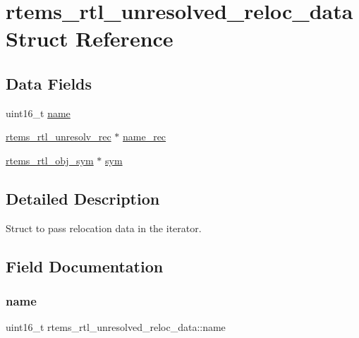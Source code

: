 \hypertarget{structrtems__rtl__unresolved__reloc__data}{}\section{rtems\+\_\+rtl\+\_\+unresolved\+\_\+reloc\+\_\+data Struct Reference}
\label{structrtems__rtl__unresolved__reloc__data}
\subsection*{Data Fields}
\begin{DoxyCompactItemize}
\item 
uint16\+\_\+t \mbox{\hyperlink{structrtems__rtl__unresolved__reloc__data_aeb4f36b3e4addc89c58dc9a40c9d7da6}{name}}
\item 
\mbox{\hyperlink{structrtems__rtl__unresolv__rec}{rtems\+\_\+rtl\+\_\+unresolv\+\_\+rec}} $\ast$ \mbox{\hyperlink{structrtems__rtl__unresolved__reloc__data_ad84833d353b2a92ebf37261a041ccb02}{name\+\_\+rec}}
\item 
\mbox{\hyperlink{structrtems__rtl__obj__sym}{rtems\+\_\+rtl\+\_\+obj\+\_\+sym}} $\ast$ \mbox{\hyperlink{structrtems__rtl__unresolved__reloc__data_a59d505cd0f42bf16ca02574abfe280be}{sym}}
\end{DoxyCompactItemize}


\subsection{Detailed Description}
Struct to pass relocation data in the iterator. 

\subsection{Field Documentation}
\mbox{\label{structrtems__rtl__unresolved__reloc__data_aeb4f36b3e4addc89c58dc9a40c9d7da6}} 
\subsubsection{\texorpdfstring{name}{name}}
{\footnotesize\ttfamily uint16\+\_\+t rtems\+\_\+rtl\+\_\+unresolved\+\_\+reloc\+\_\+data\+::name}

